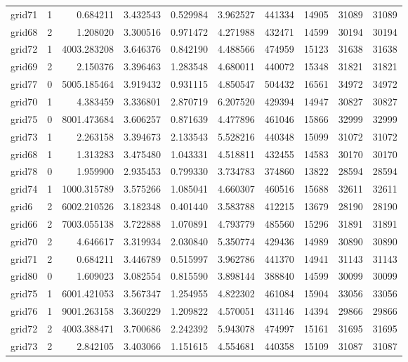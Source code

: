 \documentclass[../../../thesis.tex]{subfiles}
\begin{document}
\begin{longtable}{|l|r|r|r|r|r|r|r|r|r|}
grid71 & 1 & 0.684211 & 3.432543 & 0.529984 & 3.962527 & 441334 & 14905 & 31089 & 31089 \\
grid68 & 2 & 1.208020 & 3.300516 & 0.971472 & 4.271988 & 432471 & 14599 & 30194 & 30194 \\
grid72 & 1 & 4003.283208 & 3.646376 & 0.842190 & 4.488566 & 474959 & 15123 & 31638 & 31638 \\
grid69 & 2 & 2.150376 & 3.396463 & 1.283548 & 4.680011 & 440072 & 15348 & 31821 & 31821 \\
grid77 & 0 & 5005.185464 & 3.919432 & 0.931115 & 4.850547 & 504432 & 16561 & 34972 & 34972 \\
grid70 & 1 & 4.383459 & 3.336801 & 2.870719 & 6.207520 & 429394 & 14947 & 30827 & 30827 \\
grid75 & 0 & 8001.473684 & 3.606257 & 0.871639 & 4.477896 & 461046 & 15866 & 32999 & 32999 \\
grid73 & 1 & 2.263158 & 3.394673 & 2.133543 & 5.528216 & 440348 & 15099 & 31072 & 31072 \\
grid68 & 1 & 1.313283 & 3.475480 & 1.043331 & 4.518811 & 432455 & 14583 & 30170 & 30170 \\
grid78 & 0 & 1.959900 & 2.935453 & 0.799330 & 3.734783 & 374860 & 13822 & 28594 & 28594 \\
grid74 & 1 & 1000.315789 & 3.575266 & 1.085041 & 4.660307 & 460516 & 15688 & 32611 & 32611 \\
grid6 & 2 & 6002.210526 & 3.182348 & 0.401440 & 3.583788 & 412215 & 13679 & 28190 & 28190 \\
grid66 & 2 & 7003.055138 & 3.722888 & 1.070891 & 4.793779 & 485560 & 15296 & 31891 & 31891 \\
grid70 & 2 & 4.646617 & 3.319934 & 2.030840 & 5.350774 & 429436 & 14989 & 30890 & 30890 \\
grid71 & 2 & 0.684211 & 3.446789 & 0.515997 & 3.962786 & 441370 & 14941 & 31143 & 31143 \\
grid80 & 0 & 1.609023 & 3.082554 & 0.815590 & 3.898144 & 388840 & 14599 & 30099 & 30099 \\
grid75 & 1 & 6001.421053 & 3.567347 & 1.254955 & 4.822302 & 461084 & 15904 & 33056 & 33056 \\
grid76 & 1 & 9001.263158 & 3.360229 & 1.209822 & 4.570051 & 431146 & 14394 & 29866 & 29866 \\
grid72 & 2 & 4003.388471 & 3.700686 & 2.242392 & 5.943078 & 474997 & 15161 & 31695 & 31695 \\
grid73 & 2 & 2.842105 & 3.403066 & 1.151615 & 4.554681 & 440358 & 15109 & 31087 & 31087 \\

\end{longtable}
\end{document}
